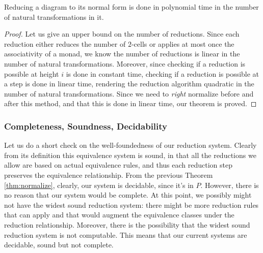 \begin{thm}
	\label{thm:normalize}
	Reducing a diagram to its normal form is done in polynomial time in
	the number of natural transformations in it.
\end{thm}
\begin{proof}
	Let us give an upper bound on the number of reductions.
	Since each reduction either reduces the number of $2$-cells or applies at
	most once the associativity of a monad, we know the number of reductions is
	linear in the	number of natural transformations.
	Moreover, since checking if a reduction is possible at height $i$ is done in
	constant time, checking if a reduction is possible at a step is done in
	linear time, rendering the reduction algorithm quadratic in the number of
	natural transformations.
	Since we need to \emph{right} normalize before and after this method, and
	that this is done in linear time, our theorem is proved.
\end{proof}

\subsubsection{Completeness, Soundness, Decidability}\label{subsubsec:sanity}
Let us do a short check on the well-foundedness of our reduction system.
Clearly from its definition this equivalence system is sound, in that all the
reductions we allow are based on actual equivalence rules, and thus each
reduction step preserves the equivalence relationship.
From the previous Theorem \ref{thm:normalize}, clearly, our system is
decidable, since it's in $P$.
However, there is no reason that our system would be complete.
At this point, we possibly might not have the widest sound reduction system:
there might be more reduction rules that can apply and that would
augment the equivalence classes under the reduction relationship.
Moreover, there is the possibility that the widest sound reduction system is
not computable.
This means that our current systems are decidable, sound but not complete.
